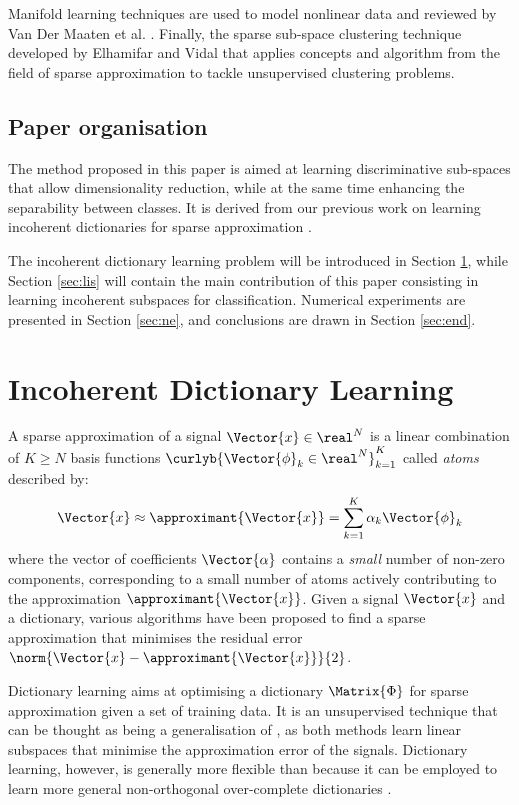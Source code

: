 \documentclass{article}
\def \fea{\Vector{x}} 	%
\def \nDim{N} 			%
\def \Dic{\Matrix{\Phi}} %
\def \nAto{K} 			%
\def \iAto{k} 			%
\def \atom{\Vector{\phi}}%
\def \coeff{\Vector{\alpha}}%
\begin{document}
Manifold learning techniques are used to model nonlinear data and reviewed by Van Der Maaten et al. \cite{Van-Der-Maaten2009Di}. Finally,  the sparse sub-space clustering technique developed by Elhamifar and Vidal \cite{Elhamifar2013Sp} that applies concepts and algorithm from the field of sparse approximation to tackle unsupervised clustering problems.

\subsection{Paper organisation}
The method proposed in this paper is aimed at learning discriminative sub-spaces that allow dimensionality reduction, while at the same time enhancing the separability between classes. It is derived from our previous work on learning incoherent dictionaries for sparse approximation \cite{Barchiesi2013Le}.

The incoherent dictionary learning problem will be introduced in Section \ref{sec:idl}, while Section \ref{sec:lis} will contain the main contribution of this paper consisting in learning incoherent subspaces for classification. Numerical experiments are presented in Section \ref{sec:ne}, and conclusions are drawn in Section \ref{sec:end}.

\section{Incoherent Dictionary Learning}\label{sec:idl}
A sparse approximation of a signal $\fea\in\real^{\nDim}$ is a linear combination of $\nAto\geq\nDim$ basis functions $\curlyb{\atom_{\iAto}\in\real^{\nDim}}_{\iAto=1}^{\nAto}$ called \emph{atoms} described by:
\begin{equation}
	\fea \approx \approximant{\fea} = \sum_{\iAto=1}^{\nAto} \alpha_{\iAto}\atom_{\iAto}
\end{equation}
where the vector of coefficients $\coeff$ contains a \emph{small} number of non-zero components, corresponding to a small number of atoms actively contributing to the approximation $\approximant{\fea}$. Given a signal $\fea$ and a dictionary, various algorithms have been proposed to find a sparse approximation that minimises the residual error $\norm{\fea-\approximant{\fea}}{2}$\cite{Elad2010Sp}.

Dictionary learning aims at optimising a dictionary $\Dic$ for sparse approximation given a set of training data. It is an unsupervised technique that can be thought as being a generalisation of , as both methods learn linear subspaces that minimise the approximation error of the signals. Dictionary learning, however, is generally more flexible than  because it can be employed to learn more general non-orthogonal over-complete dictionaries \cite{Rubinstein2010Di}.
\end{document}
